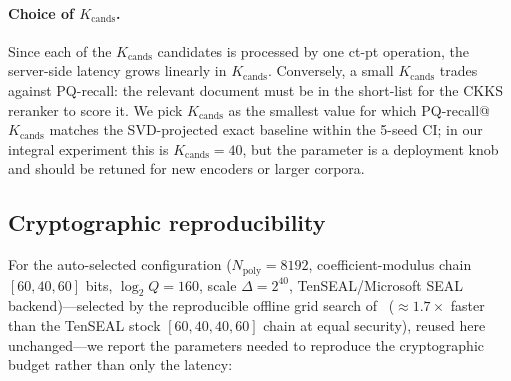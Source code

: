 \documentclass[11pt,a4paper]{article}
\begin{document}
\paragraph{Choice of $K_{\mathrm{cands}}$.} Since each of the
$K_{\mathrm{cands}}$ candidates is processed by one ct-pt operation, the
server-side latency grows linearly in $K_{\mathrm{cands}}$. Conversely, a
small $K_{\mathrm{cands}}$ trades against PQ-recall: the relevant
document must be in the short-list for the CKKS reranker to score it.
We pick $K_{\mathrm{cands}}$ as the smallest value for which
PQ-recall@$K_{\mathrm{cands}}$ matches the SVD-projected exact baseline
within the 5-seed CI; in our integral experiment this is
$K_{\mathrm{cands}} = 40$, but the parameter is a deployment knob and
should be retuned for new encoders or larger corpora.

\subsection{Cryptographic reproducibility}\label{ssec:crypto-detail}

For the auto-selected configuration
($N_{\mathrm{poly}} = 8192$, coefficient-modulus chain $[60,40,60]$ bits,
$\log_2 Q = 160$, scale $\Delta = 2^{40}$, TenSEAL/Microsoft SEAL
backend)---selected by the reproducible offline grid search of~\cite{ref_vkit,ref_alpha}
($\approx 1.7\times$ faster than the TenSEAL stock $[60,40,40,60]$ chain at equal
security), reused here unchanged---we report the parameters needed to reproduce the cryptographic
budget rather than only the latency:
\end{document}
